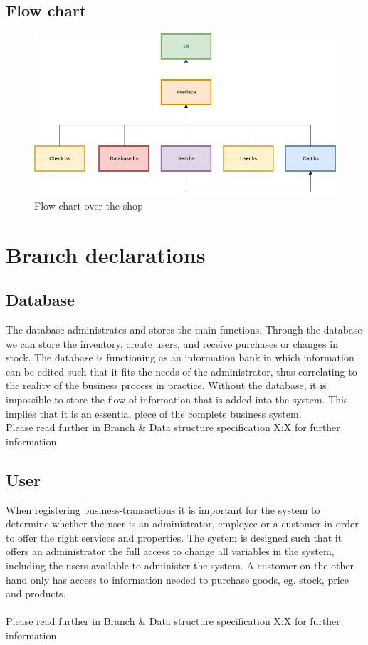 \documentclass[11pt]{article}
\begin{document}
\subsection{Flow chart}
\begin{figure}[h]
  \includegraphics[width=\linewidth]{FlowChart.png}
  \caption{Flow chart over the shop}
  \label{fig:flow chart}
\end{figure}
\newpage
\section{Branch declarations}
\subsection{Database}
The database administrates and stores the main functions. Through the database we can store the inventory, create users, and receive purchases or changes in stock.
The database is functioning as an information bank in which information can be edited such that it fits the needs of the administrator, thus correlating to the reality of the business process in practice. Without the database, it is impossible to store the flow of information that is added into the system. This implies that it is an essential piece of the complete business system.
\\
Please read further in Branch \& Data structure specification X:X for further information
\subsection{User}
When registering business-transactions it is important for the system to determine whether the user is an administrator, employee or a customer in order to offer the right services and properties.
The system is designed such that it offers an administrator the full access to change all variables in the system, including the users available to administer the system.
A customer on the other hand only has access to information needed to purchase goods, eg. stock, price and products.
\\\\
Please read further in Branch \& Data structure specification X:X for further information
\end{document}
